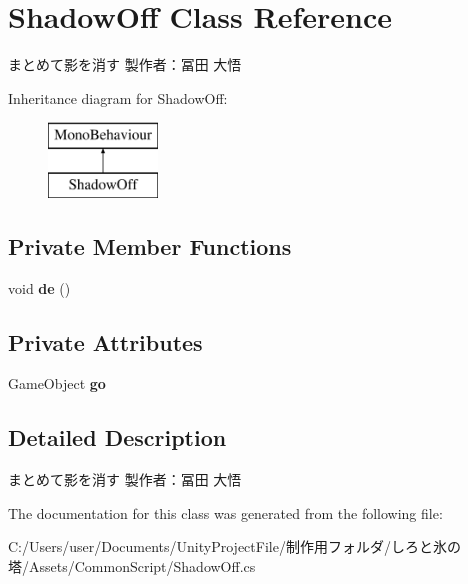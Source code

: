 \hypertarget{class_shadow_off}{}\section{Shadow\+Off Class Reference}
\label{class_shadow_off}


まとめて影を消す 製作者：冨田 大悟  


Inheritance diagram for Shadow\+Off\+:\begin{figure}[H]
\begin{center}
\leavevmode
\includegraphics[height=2.000000cm]{class_shadow_off}
\end{center}
\end{figure}
\subsection*{Private Member Functions}
\begin{DoxyCompactItemize}
\item 
\mbox{\label{class_shadow_off_acf6249fd769b22b500ef076b7318a2e9}} 
void {\bfseries de} ()
\end{DoxyCompactItemize}
\subsection*{Private Attributes}
\begin{DoxyCompactItemize}
\item 
\mbox{\label{class_shadow_off_a93b5ee1346ab121cb8a7d0974ca4dc5c}} 
Game\+Object {\bfseries go}
\end{DoxyCompactItemize}


\subsection{Detailed Description}
まとめて影を消す 製作者：冨田 大悟 



The documentation for this class was generated from the following file\+:\begin{DoxyCompactItemize}
\item 
C\+:/\+Users/user/\+Documents/\+Unity\+Project\+File/制作用フォルダ/しろと氷の塔/\+Assets/\+Common\+Script/Shadow\+Off.\+cs\end{DoxyCompactItemize}
